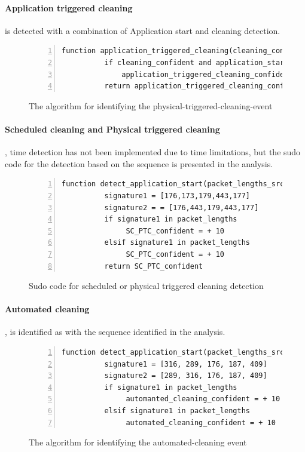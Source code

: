 \paragraph{Application triggered cleaning} is detected with a combination of Application start and cleaning detection.


\begin{figure}[H]
    \centering
    \caption{The algorithm for identifying the physical-triggered-cleaning-event}
    \label{fig:Sudo_code_application_triggered_cleaning_detection}
    \begin{lstlisting}[numbers=left]
     function application_triggered_cleaning(cleaning_confident, application_start_confident)
          if cleaning_confident and application_start_confident > 0
              application_triggered_cleaning_confident = + 10
          return application_triggered_cleaning_confident
    \end{lstlisting}
\end{figure}

\paragraph{Scheduled cleaning and Physical triggered cleaning}, time detection has not been implemented due to time limitations, but the sudo code for the detection based on the sequence is presented in the analysis. 


\begin{figure}[H]
    \centering
    \caption{Sudo code for scheduled or physical triggered cleaning detection}
    \label{fig:Sudo_code_SC_or_PC}
    \begin{lstlisting}[numbers=left]
     function detect_application_start(packet_lengths_src)
          signature1 = [176,173,179,443,177]
          signature2 = = [176,443,179,443,177]
          if signature1 in packet_lengths
               SC_PTC_confident = + 10
          elsif signature1 in packet_lengths
               SC_PTC_confident = + 10
          return SC_PTC_confident
    \end{lstlisting}
\end{figure}

\paragraph{Automated cleaning}, is identified as with the sequence identified in the analysis. 


\begin{figure}[H]
    \centering
    \caption{The algorithm for identifying the automated-cleaning event}
    \label{fig:Sudo_code_AC}
    \begin{lstlisting}[numbers=left]
     function detect_application_start(packet_lengths_src)
          signature1 = [316, 289, 176, 187, 409]
          signature2 = [289, 316, 176, 187, 409]
          if signature1 in packet_lengths
               automanted_cleaning_confident = + 10
          elsif signature1 in packet_lengths
               automated_cleaning_confident = + 10
    \end{lstlisting}
\end{figure}

